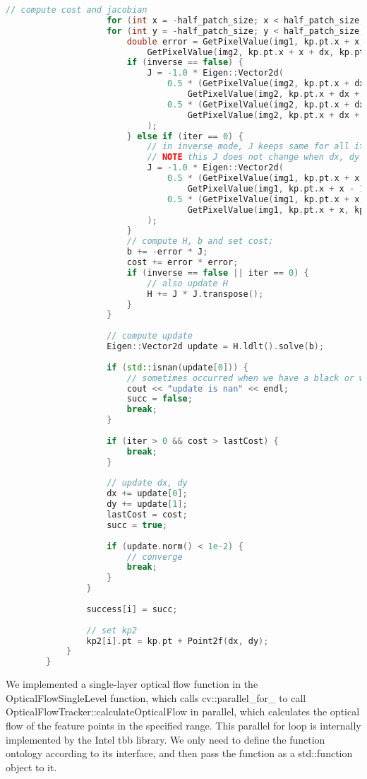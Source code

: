 \begin{lstlisting}[language=c++,caption=slambook2/ch8/optical_flow.cpp(fragment)]
					// compute cost and jacobian
					for (int x = -half_patch_size; x < half_patch_size; x++)
					for (int y = -half_patch_size; y < half_patch_size; y++) {
						double error = GetPixelValue(img1, kp.pt.x + x, kp.pt.y + y) -
							GetPixelValue(img2, kp.pt.x + x + dx, kp.pt.y + y + dy);;  // Jacobian
						if (inverse == false) {
							J = -1.0 * Eigen::Vector2d(
								0.5 * (GetPixelValue(img2, kp.pt.x + dx + x + 1, kp.pt.y + dy + y) -
									GetPixelValue(img2, kp.pt.x + dx + x - 1, kp.pt.y + dy + y)),
								0.5 * (GetPixelValue(img2, kp.pt.x + dx + x, kp.pt.y + dy + y + 1) -
									GetPixelValue(img2, kp.pt.x + dx + x, kp.pt.y + dy + y - 1))
							);
						} else if (iter == 0) {
							// in inverse mode, J keeps same for all iterations
							// NOTE this J does not change when dx, dy is updated, so we can store it and only compute error
							J = -1.0 * Eigen::Vector2d(
								0.5 * (GetPixelValue(img1, kp.pt.x + x + 1, kp.pt.y + y) -
									GetPixelValue(img1, kp.pt.x + x - 1, kp.pt.y + y)),
								0.5 * (GetPixelValue(img1, kp.pt.x + x, kp.pt.y + y + 1) -
									GetPixelValue(img1, kp.pt.x + x, kp.pt.y + y - 1))
							);
						}
						// compute H, b and set cost;
						b += -error * J;
						cost += error * error;
						if (inverse == false || iter == 0) {
							// also update H
							H += J * J.transpose();
						}
					}
					
					// compute update
					Eigen::Vector2d update = H.ldlt().solve(b);
					
					if (std::isnan(update[0])) {
						// sometimes occurred when we have a black or white patch and H is irreversible
						cout << "update is nan" << endl;
						succ = false;
						break;
					}
					
					if (iter > 0 && cost > lastCost) {
						break;
					}
					
					// update dx, dy
					dx += update[0];
					dy += update[1];
					lastCost = cost;
					succ = true;
					
					if (update.norm() < 1e-2) {
						// converge
						break;
					}
				}
				
				success[i] = succ;
				
				// set kp2
				kp2[i].pt = kp.pt + Point2f(dx, dy);
			}
		}
\end{lstlisting}

We implemented a single-layer optical flow function in the OpticalFlowSingleLevel function, which calls cv::parallel\_for\_ to call OpticalFlowTracker::calculateOpticalFlow in parallel, which calculates the optical flow of the feature points in the specified range. This parallel for loop is internally implemented by the Intel tbb library. We only need to define the function ontology according to its interface, and then pass the function as a std::function object to it.

